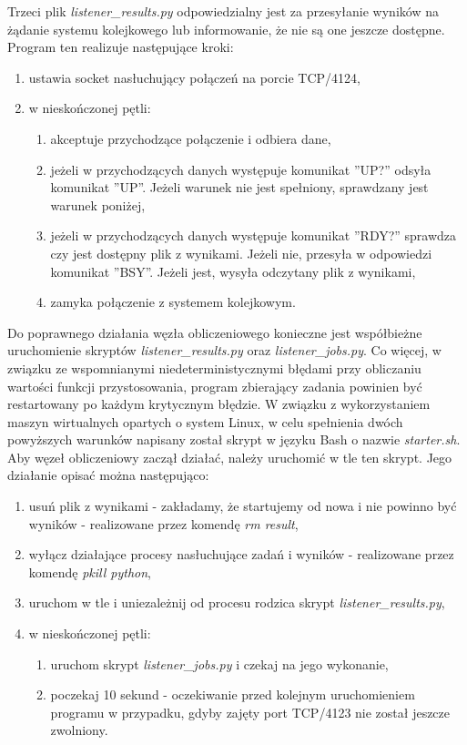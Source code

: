 Trzeci plik \textit{listener\_results.py} odpowiedzialny jest za przesyłanie wyników na żądanie systemu kolejkowego lub informowanie, że nie są one jeszcze dostępne.
Program ten realizuje następujące kroki:
\begin{enumerate}
  \item ustawia socket nasłuchujący połączeń na porcie TCP/4124,
  \item w nieskończonej pętli:
  \begin{enumerate}
    \item akceptuje przychodzące połączenie i odbiera dane,
    \item jeżeli w przychodzących danych występuje komunikat ''UP?'' odsyła komunikat ''UP''. Jeżeli warunek nie jest spełniony, sprawdzany jest warunek poniżej,
    \item jeżeli w przychodzących danych występuje komunikat ''RDY?'' sprawdza czy jest dostępny plik z wynikami. Jeżeli nie, przesyła w odpowiedzi komunikat ''BSY''. Jeżeli jest, wysyła odczytany plik z wynikami,
    \item zamyka połączenie z systemem kolejkowym.
  \end{enumerate}
\end{enumerate}

Do poprawnego działania węzła obliczeniowego konieczne jest współbieżne uruchomienie skryptów \textit{listener\_results.py} oraz \textit{listener\_jobs.py}.
Co więcej, w związku ze wspomnianymi niedeterministycznymi błędami przy obliczaniu wartości funkcji przystosowania, program zbierający zadania powinien być restartowany po każdym krytycznym błędzie.
W związku z wykorzystaniem maszyn wirtualnych opartych o system Linux, w celu spełnienia dwóch powyższych warunków napisany został skrypt w języku Bash o nazwie \textit{starter.sh}.
Aby węzeł obliczeniowy zaczął działać, należy uruchomić w tle ten skrypt.
Jego działanie opisać można następująco:
\begin{enumerate}
  \item usuń plik z wynikami - zakładamy, że startujemy od nowa i nie powinno być wyników - realizowane przez komendę \textit{rm result},
  \item wyłącz działające procesy nasłuchujące zadań i wyników - realizowane przez komendę \textit{pkill python},
  \item uruchom w tle i uniezależnij od procesu rodzica skrypt \textit{listener\_results.py},
  \item w nieskończonej pętli:
  \begin{enumerate}
    \item uruchom skrypt \textit{listener\_jobs.py} i czekaj na jego wykonanie,
    \item poczekaj 10 sekund - oczekiwanie przed kolejnym uruchomieniem programu w przypadku, gdyby zajęty port TCP/4123 nie został jeszcze zwolniony.
  \end{enumerate}
\end{enumerate}

